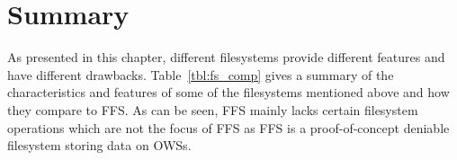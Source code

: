 
\section{Summary}
\label{sec:relatedWorkSummary}


As presented in this chapter, different filesystems provide different features and have different drawbacks. Table~\ref{tbl:fs_comp} gives a summary of the characteristics and features of some of the filesystems mentioned above and how they compare to \gls{FFS}. As can be seen, \gls{FFS} mainly lacks certain filesystem operations which are not the focus of \gls{FFS} as \gls{FFS} is a \mbox{proof-of-concept} deniable filesystem storing data on \glspl{OWS}. 


